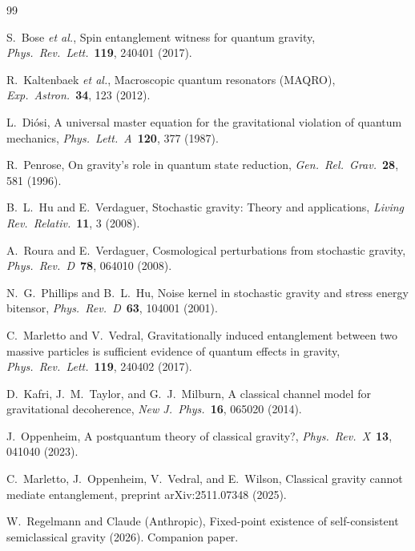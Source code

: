 \documentclass[12pt,a4paper]{article}
\begin{document}
\begin{thebibliography}{99}

 S.~Bose \textit{et al.}, Spin entanglement witness for quantum gravity,
\textit{Phys.\ Rev.\ Lett.}\ \textbf{119}, 240401 (2017).

 R.~Kaltenbaek \textit{et al.}, Macroscopic quantum resonators (MAQRO),
\textit{Exp.\ Astron.}\ \textbf{34}, 123 (2012).

 L.~Di\'osi, A universal master equation for the gravitational violation
of quantum mechanics, \textit{Phys.\ Lett.\ A}\ \textbf{120}, 377 (1987).

 R.~Penrose, On gravity's role in quantum state reduction,
\textit{Gen.\ Rel.\ Grav.}\ \textbf{28}, 581 (1996).

 B.~L.~Hu and E.~Verdaguer, Stochastic gravity: Theory and
applications, \textit{Living Rev.\ Relativ.}\ \textbf{11}, 3 (2008).

 A.~Roura and E.~Verdaguer, Cosmological perturbations from
stochastic gravity, \textit{Phys.\ Rev.\ D}\ \textbf{78}, 064010 (2008).

 N.~G.~Phillips and B.~L.~Hu, Noise kernel in stochastic gravity and
stress energy bitensor, \textit{Phys.\ Rev.\ D}\ \textbf{63}, 104001 (2001).

 C.~Marletto and V.~Vedral, Gravitationally induced entanglement
between two massive particles is sufficient evidence of quantum effects in gravity,
\textit{Phys.\ Rev.\ Lett.}\ \textbf{119}, 240402 (2017).

 D.~Kafri, J.~M.~Taylor, and G.~J.~Milburn, A classical channel model for
gravitational decoherence, \textit{New J.\ Phys.}\ \textbf{16}, 065020 (2014).

 J.~Oppenheim, A postquantum theory of classical gravity?,
\textit{Phys.\ Rev.\ X}\ \textbf{13}, 041040 (2023).

 C.~Marletto, J.~Oppenheim, V.~Vedral, and E.~Wilson,
Classical gravity cannot mediate entanglement,
preprint arXiv:2511.07348 (2025).

 W.~Regelmann and Claude (Anthropic), Fixed-point existence of
self-consistent semiclassical gravity (2026). Companion paper.

\end{thebibliography}
\end{document}
